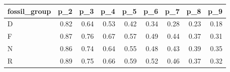 \begin{table}[ht]
\centering
\begin{tabular}{lrrrrrrrr}
  \hline
fossil\_group & p\_2 & p\_3 & p\_4 & p\_5 & p\_6 & p\_7 & p\_8 & p\_9 \\ 
  \hline
D & 0.82 & 0.64 & 0.53 & 0.42 & 0.34 & 0.28 & 0.23 & 0.18 \\ 
  F & 0.87 & 0.76 & 0.67 & 0.57 & 0.49 & 0.44 & 0.37 & 0.31 \\ 
  N & 0.86 & 0.74 & 0.64 & 0.55 & 0.48 & 0.43 & 0.39 & 0.35 \\ 
  R & 0.89 & 0.75 & 0.66 & 0.59 & 0.52 & 0.46 & 0.37 & 0.32 \\ 
   \hline
\end{tabular}
\end{table}
